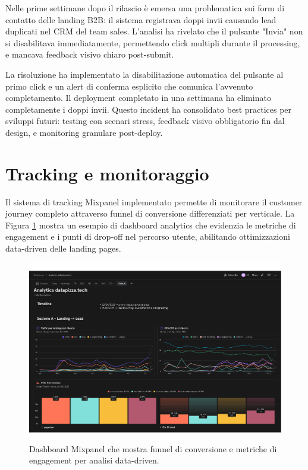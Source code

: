 Nelle prime settimane dopo il rilascio è emersa una problematica sui form di 
contatto delle landing B2B: il sistema registrava doppi invii causando lead 
duplicati nel CRM del team sales. L'analisi ha rivelato che il pulsante "Invia" 
non si disabilitava immediatamente, permettendo click multipli durante il 
processing, e mancava feedback visivo chiaro post-submit.

La risoluzione ha implementato la disabilitazione automatica del pulsante al 
primo click e un alert di conferma esplicito che comunica l'avvenuto 
completamento. Il deployment completato in una settimana ha eliminato 
completamente i doppi invii. Questo incident ha consolidato best practices 
per sviluppi futuri: testing con scenari stress, feedback visivo obbligatorio 
fin dal design, e monitoring granulare post-deploy.

\section{Tracking e monitoraggio}

Il sistema di tracking Mixpanel implementato permette di monitorare il customer 
journey completo attraverso funnel di conversione differenziati per verticale. 
La Figura \ref{fig:mixpanel-dashboard} mostra un esempio di dashboard analytics 
che evidenzia le metriche di engagement e i punti di drop-off nel percorso utente, 
abilitando ottimizzazioni data-driven delle landing pages.

\begin{figure}[h!]
    \centering
    \includegraphics[width=\textwidth]{chapters/figures/metriche1.pdf}
    \caption{Dashboard Mixpanel che mostra funnel di conversione e metriche 
    di engagement per analisi data-driven.}
    \label{fig:mixpanel-dashboard}
\end{figure}

